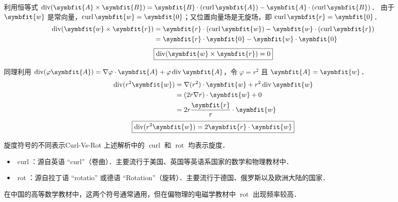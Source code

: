 \begin{solution}
    利用恒等式 $\operatorname{div} (\symbfit{A} \times \symbfit{B}) = \symbfit{B} \cdot (\operatorname{curl} \symbfit{A}) - \symbfit{A} \cdot (\operatorname{curl} \symbfit{B})$．
    由于 $\symbfit{w}$ 是常向量，$\operatorname{curl} \symbfit{w} = \symbfit{0}$；又位置向量场是无旋场，即 $\operatorname{curl} \symbfit{r} = \symbfit{0}$．
    \begin{equation}
        \begin{aligned}
            \operatorname{div} (\symbfit{w} \times \symbfit{r}) & = \symbfit{r} \cdot (\operatorname{curl} \symbfit{w}) - \symbfit{w} \cdot (\operatorname{curl} \symbfit{r}) \\
                                                                & = \symbfit{r} \cdot \symbfit{0} - \symbfit{w} \cdot \symbfit{0}
        \end{aligned}
    \end{equation}
    \begin{equation}
        \boxed{\operatorname{div} (\symbfit{w} \times \symbfit{r}) = 0}
    \end{equation}


    同理利用 $\operatorname{div} (\varphi \symbfit{A}) = \nabla \varphi \cdot \symbfit{A} + \varphi \operatorname{div} \symbfit{A}$，令 $\varphi = r^2$ 且 $\symbfit{A} = \symbfit{w}$．
    \begin{equation}
        \begin{aligned}
            \operatorname{div} (r^2 \symbfit{w}) & = \nabla(r^2) \cdot \symbfit{w} + r^2 \operatorname{div} \symbfit{w} \\
                                                 & = (2r \nabla r) \cdot \symbfit{w} + 0                                \\
                                                 & = 2r \frac{\symbfit{r}}{r} \cdot \symbfit{w}
        \end{aligned}
    \end{equation}
    \begin{equation}
        \boxed{\operatorname{div} (r^2 \symbfit{w}) = 2 \symbfit{r} \cdot \symbfit{w}}
    \end{equation}
\end{solution}

\begin{note}{旋度符号的不同表示}{Curl-Vs-Rot}
    上述解析中的 $\operatorname{curl}$ 和 $\operatorname{rot}$ 均表示旋度．
    \begin{itemize}
        \item $\operatorname{curl}$：源自英语 ``curl''（卷曲）．主要流行于美国、英国等英语系国家的数学和物理教材中．
        \item $\operatorname{rot}$：源自拉丁语 ``rotatio'' 或德语 ``Rotation''（旋转）．主要流行于德国、俄罗斯以及欧洲大陆的国家．
    \end{itemize}
    在中国的高等数学教材中，这两个符号通常通用，但在偏物理的电磁学教材中 $\operatorname{rot}$ 出现频率较高．
\end{note}



